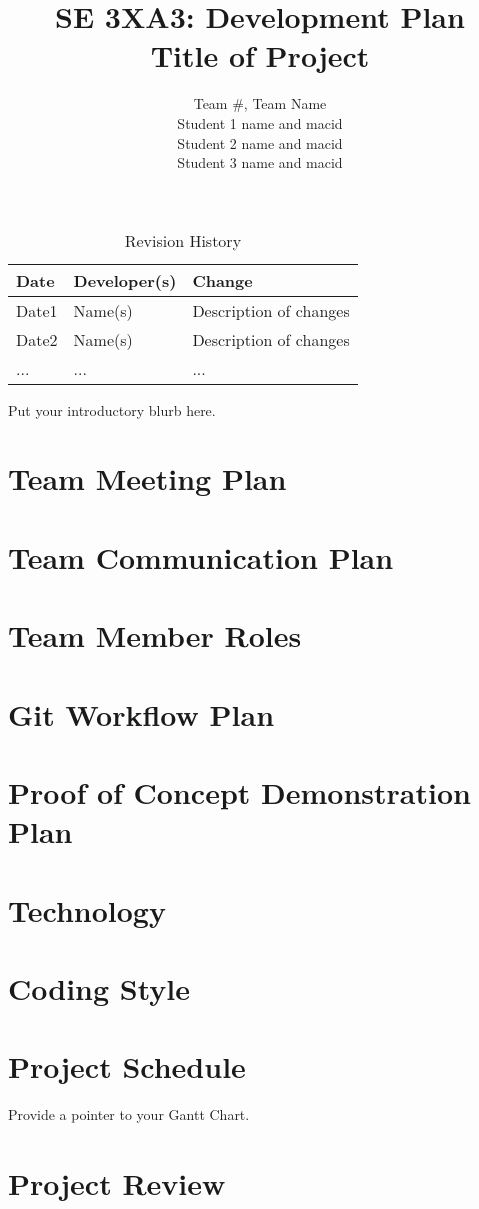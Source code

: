 \documentclass{article}
\title{SE 3XA3: Development Plan\\Title of Project}
\author{Team \#, Team Name
		\\ Student 1 name and macid
		\\ Student 2 name and macid
		\\ Student 3 name and macid
}
\date{}
\begin{document}
\begin{table}[hp]
\caption{Revision History} \label{TblRevisionHistory}
\begin{tabularx}{\textwidth}{llX}
\toprule
\textbf{Date} & \textbf{Developer(s)} & \textbf{Change}\\
\midrule
Date1 & Name(s) & Description of changes\\
Date2 & Name(s) & Description of changes\\
... & ... & ...\\
\bottomrule
\end{tabularx}
\end{table}

\newpage

\maketitle

Put your introductory blurb here.

\section{Team Meeting Plan}

\section{Team Communication Plan}

\section{Team Member Roles}

\section{Git Workflow Plan}

\section{Proof of Concept Demonstration Plan}

\section{Technology}

\section{Coding Style}

\section{Project Schedule}

Provide a pointer to your Gantt Chart.

\section{Project Review}
\end{document}
